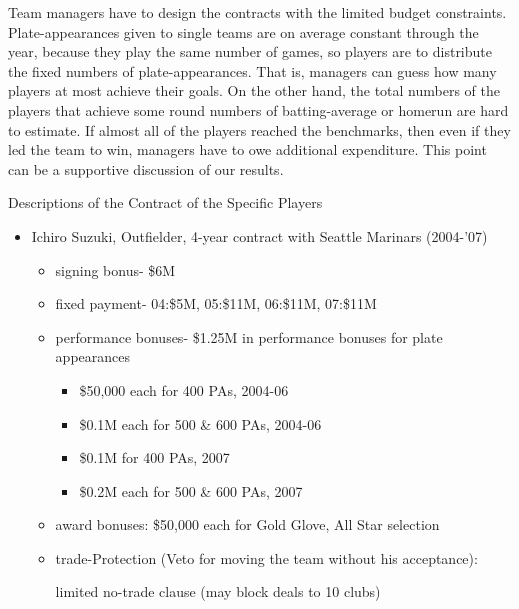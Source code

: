 \documentclass[dvipdfmx, 12pt]{article}
\begin{document}
Team managers have to design the contracts with the limited budget constraints. Plate-appearances given to single teams are on average constant through the year, because they play the same number of games, so players are to distribute the fixed numbers of plate-appearances. That is, managers can guess how many players at most achieve their goals. On the other hand, the total numbers of the players that achieve some round numbers of batting-average or homerun are hard to estimate. If almost all of the players reached the benchmarks, then even if they led the team to win, managers have to owe additional expenditure. This point can be a supportive discussion of our results.

\begin{table}
  \centering
  \small
  \caption{Descriptions of the Contract of the Specific Players}
  \label{Incentive_Contracts}
  \begin{itemize}
    \item Ichiro Suzuki, Outfielder, 4-year contract with Seattle Marinars (2004-'07)
    \begin{itemize}
      \item signing bonus- \$6M

      \item fixed payment- 04:\$5M, 05:\$11M, 06:\$11M, 07:\$11M

      \item performance bonuses- \$1.25M in performance bonuses for plate appearances

      \begin{itemize}
        \item \$50,000 each for 400 PAs, 2004-06

        \item \$0.1M each for 500 \& 600 PAs, 2004-06

        \item \$0.1M for 400 PAs, 2007

        \item \$0.2M each for 500 \& 600 PAs, 2007
      \end{itemize}

      \item award bonuses: \$50,000 each for Gold Glove, All Star selection

      \item trade-Protection (Veto for moving the team without his acceptance):

      limited no-trade clause (may block deals to 10 clubs)


\end{itemize}
\end{itemize}
\end{table}
\end{document}
